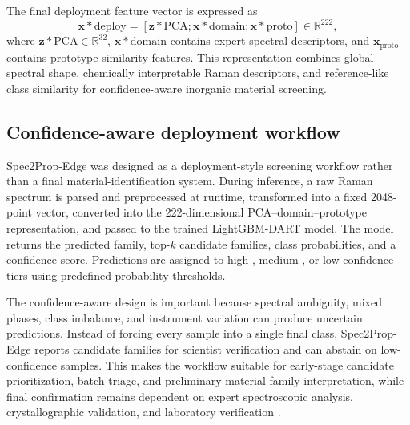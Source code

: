 The final deployment feature vector is expressed as
\begin{equation}
\mathbf{x}*{\mathrm{deploy}}=
[\mathbf{z}*{\mathrm{PCA}};
\mathbf{x}*{\mathrm{domain}};
\mathbf{x}*{\mathrm{proto}}]
\in \mathbb{R}^{222},
\end{equation}
where $\mathbf{z}*{\mathrm{PCA}}\in\mathbb{R}^{32}$, $\mathbf{x}*{\mathrm{domain}}$ contains expert spectral descriptors, and $\mathbf{x}_{\mathrm{proto}}$ contains prototype-similarity features. This representation combines global spectral shape, chemically interpretable Raman descriptors, and reference-like class similarity for confidence-aware inorganic material screening.



\subsection{Confidence-aware deployment workflow}
\label{subsec:deployment}

Spec2Prop-Edge was designed as a deployment-style screening workflow rather than a final material-identification system. During inference, a raw Raman spectrum is parsed and preprocessed at runtime, transformed into a fixed 2048-point vector, converted into the 222-dimensional PCA--domain--prototype representation, and passed to the trained LightGBM-DART model. The model returns the predicted family, top-$k$ candidate families, class probabilities, and a confidence score. Predictions are assigned to high-, medium-, or low-confidence tiers using predefined probability thresholds.

The confidence-aware design is important because spectral ambiguity, mixed phases, class imbalance, and instrument variation can produce uncertain predictions. Instead of forcing every sample into a single final class, Spec2Prop-Edge reports candidate families for scientist verification and can abstain on low-confidence samples. This makes the workflow suitable for early-stage candidate prioritization, batch triage, and preliminary material-family interpretation, while final confirmation remains dependent on expert spectroscopic analysis, crystallographic validation, and laboratory verification \cite{guo2017calibration}.
